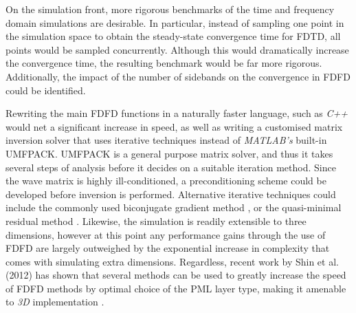 On the simulation front, more rigorous benchmarks of the time and frequency domain simulations are desirable. In particular, instead of sampling one point in the simulation space to obtain the steady-state convergence time for FDTD, all points would be sampled concurrently. Although this would dramatically increase the convergence time, the resulting benchmark would be far more rigorous. Additionally, the impact of the number of sidebands on the convergence in FDFD could be identified. 
 
Rewriting the main FDFD functions in a naturally faster language, such as \textit{C++} would net a significant increase in speed, as well as writing a customised matrix inversion solver that uses iterative techniques instead of \textit{MATLAB's} built-in UMFPACK. UMFPACK is a general purpose matrix solver, and thus it takes several steps of analysis before it decides on a suitable iteration method. Since the wave matrix is highly ill-conditioned, a preconditioning scheme could be developed before inversion is performed. Alternative iterative techniques could include the commonly used biconjugate gradient method \cite{Bank1993}, or the quasi-minimal residual method \cite{Freund1991}. Likewise, the simulation is readily extensible to three dimensions, however at this point any performance gains through the use of FDFD are largely outweighed by the exponential increase in complexity that comes with simulating extra dimensions. Regardless, recent work by Shin et al. (2012) has shown that several methods can be used to greatly increase the speed of FDFD methods by optimal choice of the PML layer type, making it amenable to \textit{3D} implementation \cite{Shin2012}. 
